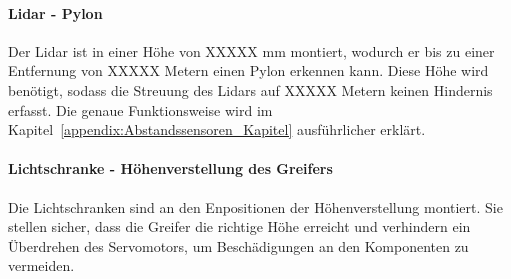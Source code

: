 \documentclass[main.tex]{subfiles} %
\begin{document}
\paragraph{Lidar - Pylon}
Der Lidar ist in einer Höhe von XXXXX mm montiert, wodurch er bis zu einer Entfernung
von XXXXX Metern einen Pylon erkennen kann. Diese Höhe wird benötigt, sodass die Streuung des Lidars auf XXXXX Metern keinen
Hindernis erfasst. Die genaue Funktionsweise wird im Kapitel~\ref{appendix:Abstandssensoren_Kapitel} ausführlicher erklärt.

\paragraph{Lichtschranke - Höhenverstellung des Greifers}

Die Lichtschranken sind an den Enpositionen der Höhenverstellung montiert.
Sie stellen sicher, dass die Greifer die richtige Höhe erreicht und verhindern
ein Überdrehen des Servomotors, um Beschädigungen an den Komponenten zu vermeiden.
\end{document}
